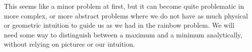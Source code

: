 This seems like a minor problem at first, but it can become quite
problematic in more complex, or more abstract problems where we do not
have as much physical or geometric intuition to guide us as we had in
the rainbow problem. We will need some way to distinguish between a
maximum and a minimum analytically, without relying on pictures or our
intuition.






